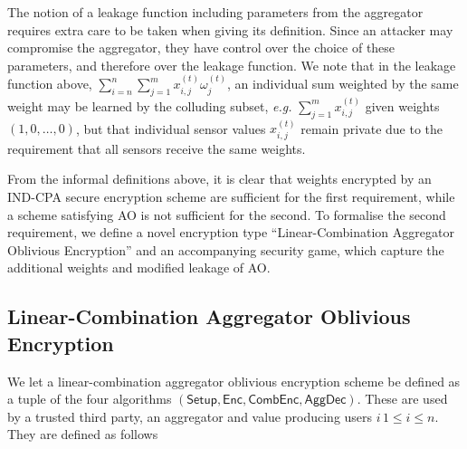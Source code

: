 \documentclass[twocolumn]{autart}
\begin{document}
\begin{rem} \label{rem:lcao_leakage}
    The notion of a leakage function including parameters from the aggregator requires extra care to be taken when giving its definition. Since an attacker may compromise the aggregator, they have control over the choice of these parameters, and therefore over the leakage function. We note that in the leakage function above, $\sum^n_{i=n}\sum^m_{j=1}x^{(t)}_{i,j}\omega^{(t)}_j$, an individual sum weighted by the same weight may be learned by the colluding subset, \textit{e.g.} $\sum^m_{j=1}x^{(t)}_{i,j}$ given weights $(1,0,\dots,0)$, but that individual sensor values $x^{(t)}_{i,j}$ remain private due to the requirement that all sensors receive the same weights.
\end{rem}

From the informal definitions above, it is clear that weights encrypted by an IND-CPA secure encryption scheme are sufficient for the first requirement, while a scheme satisfying AO is not sufficient for the second. To formalise the second requirement, we define a novel encryption type ``Linear-Combination Aggregator Oblivious Encryption'' and an accompanying security game, which capture the additional weights and modified leakage of AO.

% 
% 

\subsection{Linear-Combination Aggregator Oblivious Encryption} \label{subsec:lcao}
We let a linear-combination aggregator oblivious encryption scheme be defined as a tuple of the four algorithms $(\mathsf{Setup}, \mathsf{Enc}, \mathsf{CombEnc}, \mathsf{AggDec})$. These are used by a trusted third party, an aggregator and value producing users $i\,1\leq i \leq n$. They are defined as follows
\end{document}
